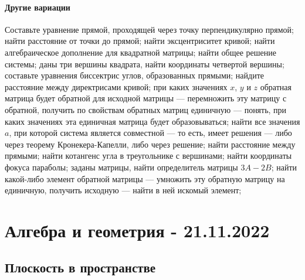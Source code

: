 \documentclass{article}
\begin{document}
\begin{flushleft}
\paragraph{Другие вариации}

Составьте уравнение прямой, проходящей через точку перпендикулярно прямой; найти расстояние от точки до прямой; найти эксцентриситет кривой; найти алгебраическое дополнение для квадратной матрицы; найти общее решение системы; даны три вершины квадрата, найти координаты четвертой вершины; составьте уравнения биссектрис углов, образованных прямыми; найдите расстояние между директрисами кривой; при каких значениях $x$, $y$ и $z$ обратная матрица будет обратной для исходной матрицы — перемножить эту матрицу с обратной, получить по свойствам обратных матриц единичную — понять, при каких значениях эта единичная матрица будет образовываться; найти все значения $a$, при которой система является совместной — то есть, имеет решения — либо через теорему Кронекера-Капелли, либо через решение; найти расстояние между прямыми; найти котангенс угла в треугольнике с вершинами; найти координаты фокуса параболы; заданы матрицы, найти определитель матрицы $3A - 2B$; найти какой-либо элемент обратной матрицы — умножить эту обратную матрицу на единичную, получить исходную — найти в ней искомый элемент;

\end{flushleft}

\pagebreak
\section{Алгебра и геометрия - 21.11.2022}

\subsection{Плоскость в пространстве}
\end{document}
